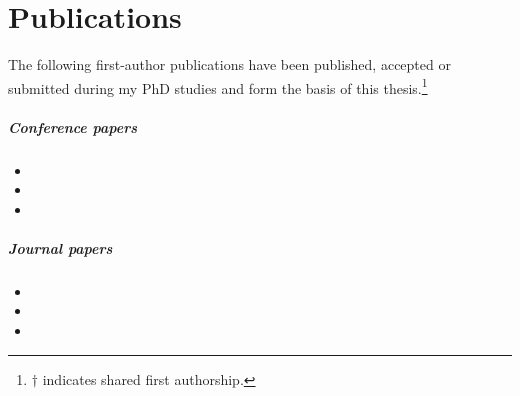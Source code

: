     \newpage
    
    \chapter*{Publications}%
    The following first-author publications have been published, accepted or submitted during my PhD studies and form the basis of this thesis.\footnote{\(\dagger\) indicates shared first authorship.}
    
    
    \begin{refsection}[ownpubs]
        
        \paragraph{Conference papers}
        \begin{itemize}
            \item {}
            \item {}
            \item {}
        \end{itemize}
        
        \paragraph{Journal papers}
        \begin{itemize}
            \item {}
            \item {}
            \item {}
        \end{itemize}
    \end{refsection}
    
